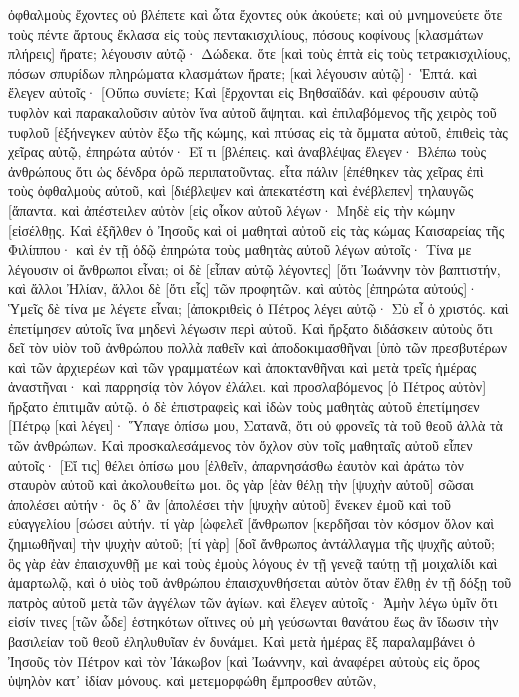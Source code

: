 ὀφθαλμοὺς ἔχοντες οὐ βλέπετε καὶ ὦτα ἔχοντες οὐκ ἀκούετε; καὶ οὐ μνημονεύετε 
ὅτε τοὺς πέντε ἄρτους ἔκλασα εἰς τοὺς πεντακισχιλίους, πόσους κοφίνους [κλασμάτων πλήρεις] ἤρατε; λέγουσιν αὐτῷ· Δώδεκα. 
ὅτε [καὶ τοὺς ἑπτὰ εἰς τοὺς τετρακισχιλίους, πόσων σπυρίδων πληρώματα κλασμάτων ἤρατε; [καὶ λέγουσιν αὐτῷ]· Ἑπτά. 
καὶ ἔλεγεν αὐτοῖς· [Οὔπω συνίετε; 
Καὶ [ἔρχονται εἰς Βηθσαϊδάν. καὶ φέρουσιν αὐτῷ τυφλὸν καὶ παρακαλοῦσιν αὐτὸν ἵνα αὐτοῦ ἅψηται. 
καὶ ἐπιλαβόμενος τῆς χειρὸς τοῦ τυφλοῦ [ἐξήνεγκεν αὐτὸν ἔξω τῆς κώμης, καὶ πτύσας εἰς τὰ ὄμματα αὐτοῦ, ἐπιθεὶς τὰς χεῖρας αὐτῷ, ἐπηρώτα αὐτόν· Εἴ τι [βλέπεις. 
καὶ ἀναβλέψας ἔλεγεν· Βλέπω τοὺς ἀνθρώπους ὅτι ὡς δένδρα ὁρῶ περιπατοῦντας. 
εἶτα πάλιν [ἐπέθηκεν τὰς χεῖρας ἐπὶ τοὺς ὀφθαλμοὺς αὐτοῦ, καὶ [διέβλεψεν καὶ ἀπεκατέστη καὶ ἐνέβλεπεν] τηλαυγῶς [ἅπαντα. 
καὶ ἀπέστειλεν αὐτὸν [εἰς οἶκον αὐτοῦ λέγων· Μηδὲ εἰς τὴν κώμην [εἰσέλθῃς. 
Καὶ ἐξῆλθεν ὁ Ἰησοῦς καὶ οἱ μαθηταὶ αὐτοῦ εἰς τὰς κώμας Καισαρείας τῆς Φιλίππου· καὶ ἐν τῇ ὁδῷ ἐπηρώτα τοὺς μαθητὰς αὐτοῦ λέγων αὐτοῖς· Τίνα με λέγουσιν οἱ ἄνθρωποι εἶναι; 
οἱ δὲ [εἶπαν αὐτῷ λέγοντες] [ὅτι Ἰωάννην τὸν βαπτιστήν, καὶ ἄλλοι Ἠλίαν, ἄλλοι δὲ [ὅτι εἷς] τῶν προφητῶν. 
καὶ αὐτὸς [ἐπηρώτα αὐτούς]· Ὑμεῖς δὲ τίνα με λέγετε εἶναι; [ἀποκριθεὶς ὁ Πέτρος λέγει αὐτῷ· Σὺ εἶ ὁ χριστός. 
καὶ ἐπετίμησεν αὐτοῖς ἵνα μηδενὶ λέγωσιν περὶ αὐτοῦ. 
Καὶ ἤρξατο διδάσκειν αὐτοὺς ὅτι δεῖ τὸν υἱὸν τοῦ ἀνθρώπου πολλὰ παθεῖν καὶ ἀποδοκιμασθῆναι [ὑπὸ τῶν πρεσβυτέρων καὶ τῶν ἀρχιερέων καὶ τῶν γραμματέων καὶ ἀποκτανθῆναι καὶ μετὰ τρεῖς ἡμέρας ἀναστῆναι· 
καὶ παρρησίᾳ τὸν λόγον ἐλάλει. καὶ προσλαβόμενος [ὁ Πέτρος αὐτὸν] ἤρξατο ἐπιτιμᾶν αὐτῷ. 
ὁ δὲ ἐπιστραφεὶς καὶ ἰδὼν τοὺς μαθητὰς αὐτοῦ ἐπετίμησεν [Πέτρῳ [καὶ λέγει]· Ὕπαγε ὀπίσω μου, Σατανᾶ, ὅτι οὐ φρονεῖς τὰ τοῦ θεοῦ ἀλλὰ τὰ τῶν ἀνθρώπων. 
Καὶ προσκαλεσάμενος τὸν ὄχλον σὺν τοῖς μαθηταῖς αὐτοῦ εἶπεν αὐτοῖς· [Εἴ τις] θέλει ὀπίσω μου [ἐλθεῖν, ἀπαρνησάσθω ἑαυτὸν καὶ ἀράτω τὸν σταυρὸν αὐτοῦ καὶ ἀκολουθείτω μοι. 
ὃς γὰρ [ἐὰν θέλῃ τὴν [ψυχὴν αὐτοῦ] σῶσαι ἀπολέσει αὐτήν· ὃς δ᾽ ἂν [ἀπολέσει τὴν [ψυχὴν αὐτοῦ] ἕνεκεν ἐμοῦ καὶ τοῦ εὐαγγελίου [σώσει αὐτήν. 
τί γὰρ [ὠφελεῖ [ἄνθρωπον [κερδῆσαι τὸν κόσμον ὅλον καὶ ζημιωθῆναι] τὴν ψυχὴν αὐτοῦ; 
[τί γὰρ] [δοῖ ἄνθρωπος ἀντάλλαγμα τῆς ψυχῆς αὐτοῦ; 
ὃς γὰρ ἐὰν ἐπαισχυνθῇ με καὶ τοὺς ἐμοὺς λόγους ἐν τῇ γενεᾷ ταύτῃ τῇ μοιχαλίδι καὶ ἁμαρτωλῷ, καὶ ὁ υἱὸς τοῦ ἀνθρώπου ἐπαισχυνθήσεται αὐτὸν ὅταν ἔλθῃ ἐν τῇ δόξῃ τοῦ πατρὸς αὐτοῦ μετὰ τῶν ἀγγέλων τῶν ἁγίων. 
καὶ ἔλεγεν αὐτοῖς· Ἀμὴν λέγω ὑμῖν ὅτι εἰσίν τινες [τῶν ὧδε] ἑστηκότων οἵτινες οὐ μὴ γεύσωνται θανάτου ἕως ἂν ἴδωσιν τὴν βασιλείαν τοῦ θεοῦ ἐληλυθυῖαν ἐν δυνάμει. 
Καὶ μετὰ ἡμέρας ἓξ παραλαμβάνει ὁ Ἰησοῦς τὸν Πέτρον καὶ τὸν Ἰάκωβον [καὶ Ἰωάννην, καὶ ἀναφέρει αὐτοὺς εἰς ὄρος ὑψηλὸν κατ᾽ ἰδίαν μόνους. καὶ μετεμορφώθη ἔμπροσθεν αὐτῶν, 
